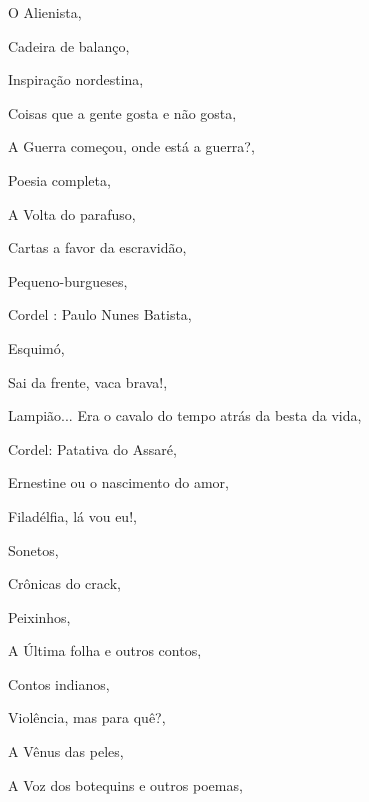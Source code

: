 \begin{multicols}{2}
\begin{enumerate}
{\item O Alienista, {}
\item Cadeira de balanço, {}
\item Inspiração nordestina, {}
\item Coisas que a gente gosta e não gosta, {}
\item A Guerra começou, onde está a guerra?, {}
\item Poesia completa, {}
\item A Volta do parafuso, {}
\item Cartas a favor da escravidão, {}
\item Pequeno-burgueses, {}
\item Cordel : Paulo Nunes Batista, {}
\item Esquimó, {}
\item Sai da frente, vaca brava!, {}
\item Lampião... Era o cavalo do tempo atrás da besta da vida, {}
\item Cordel: Patativa do Assaré, {}
\item Ernestine ou o nascimento do amor, {}
\item Filadélfia, lá vou eu!, {}
\item Sonetos, {}
\item Crônicas do crack, {}
\item Peixinhos, {}
\item A Última folha e outros contos, {}
\item Contos indianos, {}
\item Violência, mas para quê?, {}
\item A Vênus das peles, {}
\item A Voz dos botequins e outros poemas, {}
}
\end{enumerate}
\end{multicols}
